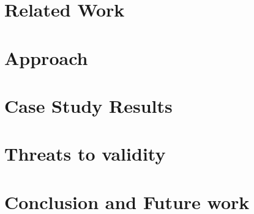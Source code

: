 \documentclass[conference]{IEEEtran}
\begin{document}
\section{Related Work}
\label{sec:related_work}


\section{Approach}
\label{sec:approach}


\section{Case Study Results}
\label{sec:results}


\section{Threats to validity}
\label{sec:threats_to_validity}


\section{Conclusion and Future work}
\label{sec:conclusion}




\end{document}
